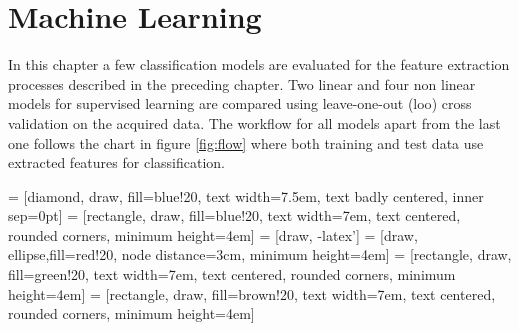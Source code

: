 \chapter{Machine Learning}

In this chapter a few classification models are evaluated for the feature extraction processes described in the preceding chapter. Two linear and four non linear models for supervised learning are compared using leave-one-out (\gls{loo}) cross validation on the acquired data. The workflow for all models apart from the last one follows the chart in figure \ref{fig:flow} where both training and test data use extracted features for classification.

 = [diamond, draw, fill=blue!20, 
    text width=7.5em, text badly centered, inner sep=0pt]
 = [rectangle, draw, fill=blue!20, 
    text width=7em, text centered, rounded corners, minimum height=4em]
 = [draw, -latex']
 = [draw, ellipse,fill=red!20, node distance=3cm,
    minimum height=4em]
 = [rectangle, draw, fill=green!20, 
    text width=7em, text centered, rounded corners, minimum height=4em]
 = [rectangle, draw, fill=brown!20, 
    text width=7em, text centered, rounded corners, minimum height=4em]


